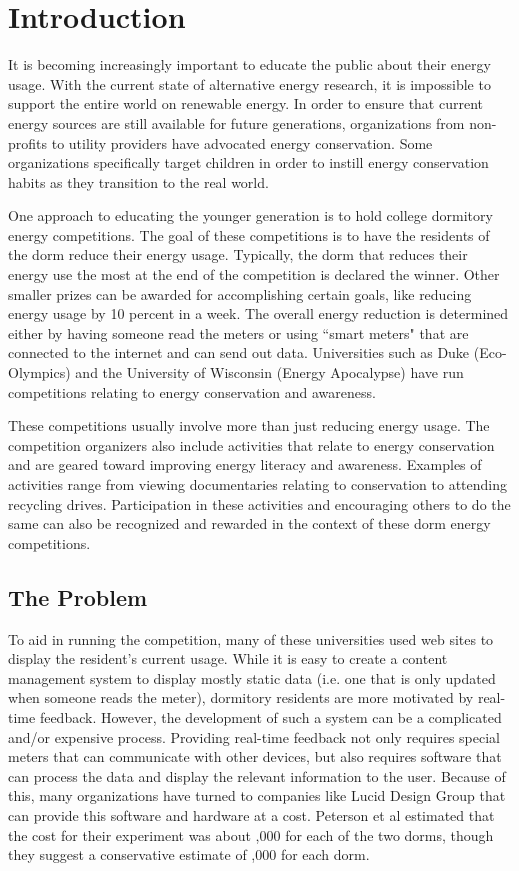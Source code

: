 \chapter{Introduction}
It is becoming increasingly important to educate the public about their energy usage.  With the current state of alternative energy research, it is impossible to support the entire world on renewable energy.  In order to ensure that current energy sources are still available for future generations, organizations from non-profits\cite{blueplanet} to utility providers\cite{heco} have advocated energy conservation.  Some organizations specifically target children in order to instill energy conservation habits as they transition to the real world\cite{energyhog}.

One approach to educating the younger generation is to hold college dormitory energy competitions.  The goal of these competitions is to have the residents of the dorm reduce their energy usage.  Typically, the dorm that reduces their energy use the most at the end of the competition is declared the winner.  Other smaller prizes can be awarded for accomplishing certain goals, like reducing energy usage by 10 percent in a week.  The overall energy reduction is determined either by having someone read the meters or using ``smart meters" that are connected to the internet and can send out data.  Universities such as Duke (Eco-Olympics) and the University of Wisconsin (Energy Apocalypse) have run competitions relating to energy conservation and awareness. 

These competitions usually involve more than just reducing energy usage.  The competition organizers also include activities that relate to energy conservation and are geared toward improving energy literacy and awareness.  Examples of activities range from viewing documentaries relating to conservation to attending recycling drives.  Participation in these activities and encouraging others to do the same can also be recognized and rewarded in the context of these dorm energy competitions.

\section{The Problem}

To aid in running the competition, many of these universities used web sites to display the resident's current usage.  While it is easy to create a content management system to display mostly static data (i.e. one that is only updated when someone reads the meter), dormitory residents are more motivated by real-time feedback\cite{oberlin-feedback}.  However, the development of such a system can be a complicated and/or expensive process.  Providing real-time feedback not only requires special meters that can communicate with other devices, but also requires software that can process the data and display the relevant information to the user.  Because of this, many organizations have turned to companies like Lucid Design Group that can provide this software and hardware at a cost.  Peterson et al estimated that the cost for their experiment was about ,000 for each of the two dorms, though they suggest a conservative estimate of ,000 for each dorm.

